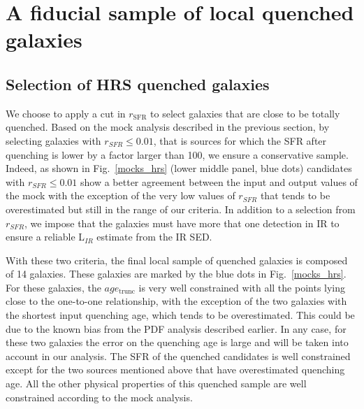 \documentclass[traditabstract]{aa} %
\begin{document}
\section{\label{seleclocal}A fiducial sample of local quenched galaxies}

\subsection{Selection of HRS quenched galaxies}

We choose to apply a cut in $r_{\mathrm{SFR}}$ to select galaxies that are close to be totally quenched.
Based on the mock analysis described in the previous section, by selecting galaxies with $r_{SFR}\leq0.01$, that is sources for which the SFR after quenching is lower by a factor larger than 100, we ensure a conservative sample.
Indeed, as shown in Fig.~\ref{mocks_hrs} (lower middle panel, blue dots) candidates with $r_{SFR}\leq0.01$ show a better agreement between the input and output values of the mock with the exception of the very low values of $r_{SFR}$ that tends to be overestimated but still in the range of our criteria.
In addition to a selection from $r_{SFR}$, we impose that the galaxies must have more that one detection in IR to ensure a reliable L$_{IR}$ estimate from the IR SED.

With these two criteria, the final local sample of quenched galaxies is composed of 14 galaxies.
These galaxies are marked by the blue dots in Fig.~\ref{mocks_hrs}. 
For these galaxies, the $age_{\mathrm{trunc}}$ is very well constrained with all the points lying close to the one-to-one relationship, with the exception of the two galaxies with the shortest input quenching age, which tends to be overestimated.
This could be due to the known bias from the PDF analysis described earlier. 
In any case, for these two galaxies the error on the quenching age is large and will be taken into account in our analysis.
The SFR of the quenched candidates is well constrained except for the two sources mentioned above that have overestimated quenching age.
All the other physical properties of this quenched sample are well constrained according to the mock analysis.
\end{document}
